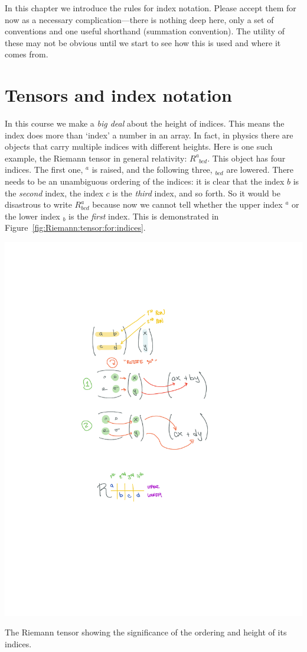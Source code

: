 \documentclass[12pt, oneside]{report}    %
\let\oldsection\section
\def\section{%
  \setcounter{sidenote}{1}%
  \oldsection
}
\begin{document}
In this chapter we introduce the rules for index notation. Please accept them for now as a necessary complication---there is nothing deep here, only a set of conventions and one useful shorthand (summation convention). The utility of these may not be obvious until we start to see how this is used and where it comes from.

\section{Tensors and index notation}
\label{sec:index:notation}

In this course we make a \emph{big deal} about the height of indices. This means the index does more than  `index' a number in an array. In fact, in physics there are objects that carry multiple indices with different heights. Here is one such example, the Riemann tensor in general relativity: $R^a_{\phantom{a}bcd}$. This object has four indices. The first one, $^a$ is raised, and the following three, $_{bcd}$ are lowered. There needs to be an unambiguous ordering of the indices: it is clear that the index $b$ is the \emph{second} index, the index $c$ is the \emph{third} index, and so forth. So it would be disastrous to write $R^a_{bcd}$ because now we cannot tell whether the upper index $^a$ or the lower index $_b$ is the \emph{first} index. This is demonstrated in Figure~\ref{fig:Riemann:tensor:for:indices}.
\begin{marginfigure}%
    \includegraphics[width=.8\textwidth]{figures/Rabcd_eg.pdf}
    \caption{The Riemann tensor showing the significance of the ordering and height of its indices.}
    \label{fig:Riemann:tensor:for:indices}
\end{marginfigure}
\end{document}
